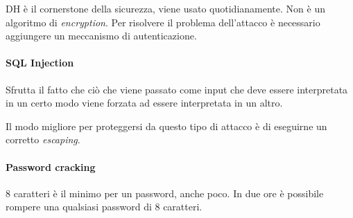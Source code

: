 DH è il cornerstone della sicurezza, viene usato quotidianamente. Non è un 
algoritmo di \textit{encryption}.
Per risolvere il problema dell'attacco è necessario aggiungere un meccanismo di 
autenticazione.

\paragraph{SQL Injection}

Sfrutta il fatto che ciò che viene passato come input che deve essere 
interpretata in un certo modo viene forzata ad essere interpretata in un altro.

Il modo migliore per proteggersi da questo tipo di attacco è di eseguirne un 
corretto \textit{escaping}.

\paragraph{Password cracking}


8 caratteri è il minimo per un password, anche poco. In due ore è possibile 
rompere una qualsiasi password di 8 caratteri.
